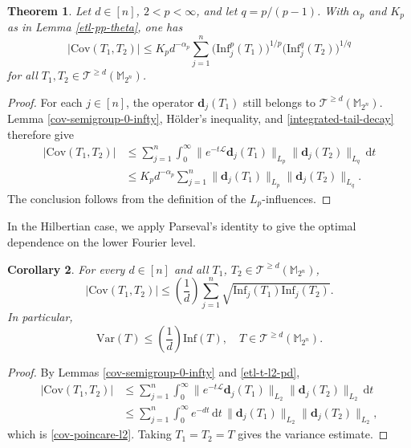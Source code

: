\documentclass{amsbook}
\newtheorem{theorem}{Theorem}[chapter]
\newtheorem{corollary}[theorem]{Corollary}
\theoremstyle{definition}
\theoremstyle{remark}
\numberwithin{section}{chapter}
\numberwithin{equation}{chapter}
\newcommand{\M}{\mathbb{M}}
\newcommand{\1}{\mathbf{1}}
\newcommand{\dc}{\mathbf{d}}
\begin{document}
\begin{theorem}\label{ci-pq}
Let $d\in[n]$,  $2<p<\infty$, and let $q=p/(p-1)$.  With
$\alpha_p$ and $K_p$ as in Lemma \ref{etl-pp-theta}, one has
\begin{equation}\label{cov-poincare-pq}
\big|\mathrm{Cov}(T_1,T_2)\big|
 \leq K_p d^{-\alpha_p}
 \sum_{j=1}^n
 \big(\mathrm{Inf}_j^p(T_1)\big)^{1/p}
 \big(\mathrm{Inf}_j^q(T_2)\big)^{1/q}
\end{equation}
for all $T_1,T_2\in\mathcal{T}^{\geq d}(\M_{2^{n}})$.
\end{theorem}

\begin{proof}
For each $j\in[n]$, the operator $\dc_j(T_1)$ still belongs to $\mathcal{T}^{\geq d}(\M_{2^{n}})$.  Lemma \ref{cov-semigroup-0-infty}, H\"older's inequality, and \eqref{integrated-tail-decay} therefore give
\begin{align*}
\big|\mathrm{Cov}(T_1,T_2)\big|&\leq \sum_{j=1}^n\int_0^\infty \|e^{-t\mathcal{L}}\dc_j(T_1)\|_{L_p}\|\dc_j(T_2)\|_{L_q}\,\mathrm{d}t\\
&\leq K_{p}d^{-\alpha_p}\sum_{j=1}^n\|\dc_{j}(T_1)\|_{L_p}\|\dc_j(T_2)\|_{L_q}.
\end{align*}
The conclusion follows from the definition of the $L_{p}$-influences.
\end{proof}

In the Hilbertian case, we apply Parseval's identity to give the optimal dependence on the lower Fourier level.

\begin{corollary}\label{cov-poincare-l2-tail}
For every $d\in[n]$ and all $T_{1}$, $T_{2}\in\mathcal{T}^{\geq d}(\M_{2^{n}})$,
\begin{equation}\label{cov-poincare-l2}
\big|\mathrm{Cov}(T_{1},T_{2})\big|\leq\left(\frac{1}{d}\right)\sum_{j=1}^n\sqrt{\mathrm{Inf}_{j}(T_1)\mathrm{Inf}_{j}(T_2)}.
\end{equation}
In particular,
\[
\mathrm{Var}(T)\leq \left(\frac{1}{d}\right)\mathrm{Inf}(T),
\quad T\in\mathcal{T}^{\geq d}(\M_{2^{n}}).
\]
\end{corollary}

\begin{proof}
By Lemmas \ref{cov-semigroup-0-infty} and \ref{etl-t-l2-pd},
\begin{align*}
\big|\mathrm{Cov}(T_1,T_2)\big|
&\leq\sum_{j=1}^n\int_0^\infty
 \|e^{-t\mathcal{L}}\dc_j(T_1)\|_{L_2}
 \|\dc_j(T_2)\|_{L_2}\,\mathrm{d}t\\
&\leq\sum_{j=1}^n\int_0^\infty e^{-dt}\,\mathrm{d}t\,
 \|\dc_j(T_1)\|_{L_2}\|\dc_j(T_2)\|_{L_2},
\end{align*}
which is \eqref{cov-poincare-l2}.  Taking $T_1=T_2=T$ gives the
variance estimate.
\end{proof}
\end{document}
